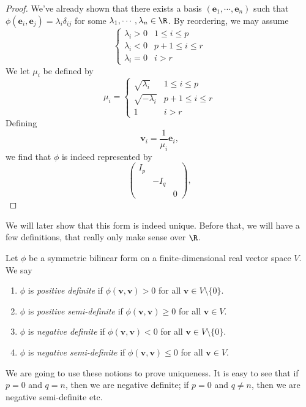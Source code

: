 \documentclass[a4paper]{article}
\begin{document}
\begin{proof}
  We've already shown that there exists a basis $(\mathbf{e}_1, \cdots, \mathbf{e}_n)$ such that $\phi(\mathbf{e}_i, \mathbf{e}_j) = \lambda_i \delta_{ij}$ for some $\lambda_1, \cdots, \lambda_n \in \R$. By reordering, we may assume
  \[
    \begin{cases}
      \lambda_i > 0 & 1 \leq i \leq p\\
      \lambda_i < 0 & p + 1 \leq i \leq r\\
      \lambda_i = 0 & i > r
    \end{cases}
  \]
  We let $\mu_i$ be defined by
  \[
    \mu_i =
    \begin{cases}
      \sqrt{\lambda_i} & 1 \leq i \leq p\\
      \sqrt{-\lambda_i} & p + 1 \leq i \leq r\\
      1 & i > r
    \end{cases}
  \]
  Defining
  \[
    \mathbf{v}_i = \frac{1}{\mu_i}\mathbf{e}_i,
  \]
  we find that $\phi$ is indeed represented by
  \[
    \begin{pmatrix}
      I_p\\
      & -I_q\\
      & & 0
    \end{pmatrix},
  \]
\end{proof}
We will later show that this form is indeed unique. Before that, we will have a few definitions, that really only make sense over $\R$.

\begin{defi}
  Let $\phi$ be a symmetric bilinear form on a finite-dimensional real vector space $V$. We say
  \begin{enumerate}
    \item $\phi$ is \emph{positive definite} if $\phi(\mathbf{v}, \mathbf{v}) > 0$ for all $\mathbf{v} \in V\setminus \{0\}$.
    \item $\phi$ is \emph{positive semi-definite} if $\phi(\mathbf{v}, \mathbf{v}) \geq 0$ for all $\mathbf{v} \in V$.
    \item $\phi$ is \emph{negative definite} if $\phi(\mathbf{v}, \mathbf{v}) < 0$ for all $\mathbf{v} \in V\setminus \{0\}$.
    \item $\phi$ is \emph{negative semi-definite} if $\phi(\mathbf{v}, \mathbf{v}) \leq 0$ for all $\mathbf{v} \in V$.
  \end{enumerate}
\end{defi}

We are going to use these notions to prove uniqueness. It is easy to see that if $p = 0$ and $q = n$, then we are negative definite; if $p = 0$ and $q \not= n$, then we are negative semi-definite etc.
\end{document}
